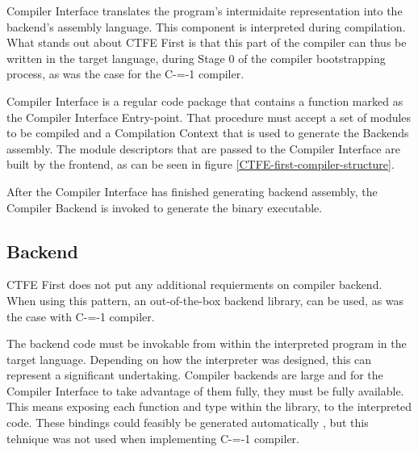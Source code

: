 Compiler Interface translates the program's intermidaite representation into the backend's assembly language.
This component is interpreted during compilation.
What stands out about CTFE First is that this part of the compiler can thus be written in the target language, during Stage 0 of the compiler bootstrapping process, as was the case for the C-=-1 compiler\cite{puntambekar:compiler_design, novillo2007gcc, grabski2022compilation}.

Compiler Interface is a regular code package that contains a function marked as the Compiler Interface Entry-point.
That procedure must accept a set of modules to be compiled and a Compilation Context that is used to generate the Backends assembly.
The module descriptors that are passed to the Compiler Interface are built by the frontend, as can be seen in figure \ref{CTFE-first-compiler-structure}.

After the Compiler Interface has finished generating backend assembly, the Compiler Backend is invoked to generate the binary executable.
\subsection{Backend}
\label{backend}

CTFE First does not put any additional requierments on compiler backend.
When using this pattern, an out-of-the-box backend library, can be used, as was the case with C-=-1 compiler.

The backend code must be invokable from within the interpreted program in the target language.
Depending on how the interpreter was designed, this can represent a significant undertaking.
Compiler backends are large and for the Compiler Interface to take advantage of them fully, they must be fully available.
This means exposing each function and type within the library, to the interpreted code.
These bindings could feasibly be generated automatically \cite{marshalling_auto_generation}, but this tehnique was not used when implementing C-=-1 compiler.
